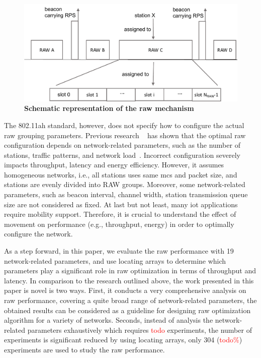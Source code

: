 \begin{figure}[t]
  \centering
  \includegraphics[width=0.8\columnwidth]{image/raw.pdf}
  \caption{\textbf{Schematic representation of the \gls{raw} mechanism}\label{fig:RAW}}
\end{figure}

The 802.11ah standard, however, does not specify how to configure the actual \gls{raw} grouping parameters. Previous research ~\cite{WoWMoM2016} has shown that the optimal \gls{raw} configuration depends on network-related parameters, such as the number of stations, traffic patterns, and network load~\cite{WoWMoM2016}. Incorrect configuration severely impacts throughput, latency and energy efficiency. However, it assumes homogeneous networks, i.e., all stations uses same \gls{mcs} and packet size, and stations are evenly divided into RAW groups. Moreover, some network-related parameters, such as beacon interval, channel width, station transmission queue size are not considered as fixed. At last but not least, many \gls{iot} applications require mobility support. Therefore, it is crucial to understand the effect of movement on performance (e.g., throughput, energy) in order to optimally configure the network.




As a step forward, in this paper, we evaluate the \gls{raw} performance with 19 network-related parameters, and use locating arrays to determine which parameters play a significant role in \gls{raw} optimization in terms of throughput and latency. In comparison to the research outlined above, the work presented in this paper is novel is two ways. First, it conducts a very comprehensive analysis on \gls{raw} performance, covering a quite broad range of network-related parameters, the obtained results can be considered as a guideline for designing \gls{raw} optimization algorithm for a variety of networks. Seconds, instead of analysis the network-related parameters exhaustively which requires \textcolor{red}{todo} experiments, the number of experiments is significant reduced by using locating arrays, only 304 (\textcolor{red}{todo\%}) experiments are used to study the \gls{raw} performance.

